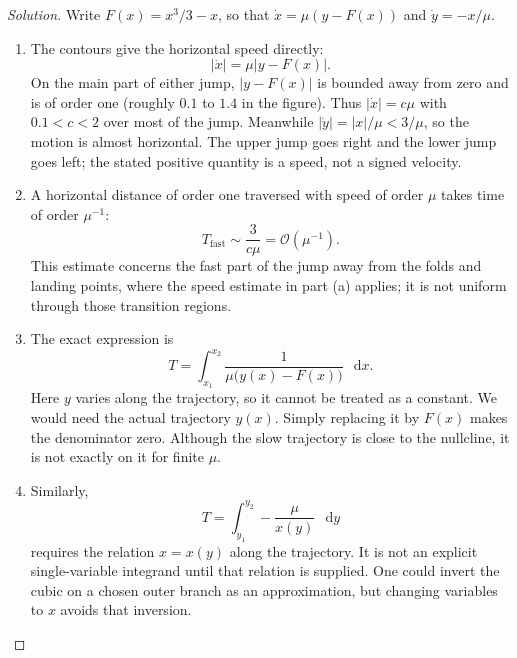 \documentclass[12pt]{amsart}
\theoremstyle{plain}
\theoremstyle{definition}
\theoremstyle{definition}
\theoremstyle{plain}
\newenvironment{solution}
{\begin{proof}[Solution]}
{\end{proof}}
\newcommand{\dd}{\mathop{}\!\mathrm{d}}
\begin{document}
\begin{enumerate}
        \begin{solution}
        Write $F(x)=x^3/3-x$, so that $\dot x=\mu(y-F(x))$ and
        $\dot y=-x/\mu$.
        \begin{enumerate}[label=(\alph*),leftmargin=*]
            \item The contours give the horizontal speed directly:
            \[
                |\dot x|=\mu|y-F(x)|.
            \]
            On the main part of either jump, $|y-F(x)|$ is bounded away
            from zero and is of order one (roughly $0.1$ to $1.4$ in
            the figure). Thus $|\dot x|=c\mu$ with $0.1<c<2$ over most
            of the jump. Meanwhile $|\dot y|=|x|/\mu<3/\mu$, so the
            motion is almost horizontal. The upper jump goes right and
            the lower jump goes left; the stated positive quantity is
            a speed, not a signed velocity.

            \item A horizontal distance of order one traversed with
            speed of order $\mu$ takes time of order $\mu^{-1}$:
            \[
                T_{\mathrm{fast}}\sim\frac{3}{c\mu}
                =\mathcal O(\mu^{-1}).
            \]
            This estimate concerns the fast part of the jump away from
            the folds and landing points, where the speed estimate in
            part (a) applies; it is not uniform through those transition
            regions.

            \item The exact expression is
            \[
                T=\int_{x_1}^{x_2}
                \frac{1}{\mu\bigl(y(x)-F(x)\bigr)}\,\dd x.
            \]
            Here $y$ varies along the trajectory, so it cannot be treated
            as a constant. We would need the actual trajectory $y(x)$.
            Simply replacing it by $F(x)$ makes the denominator zero.
            Although the slow trajectory is close to the nullcline, it
            is not exactly on it for finite $\mu$.

            \item Similarly,
            \[
                T=\int_{y_1}^{y_2}-\frac{\mu}{x(y)}\,\dd y
            \]
            requires the relation $x=x(y)$ along the trajectory. It is
            not an explicit single-variable integrand until that relation
            is supplied. One could invert the cubic on a chosen outer
            branch as an approximation, but changing variables to $x$
            avoids that inversion.


\end{enumerate}
\end{solution}
\end{enumerate}
\end{document}
